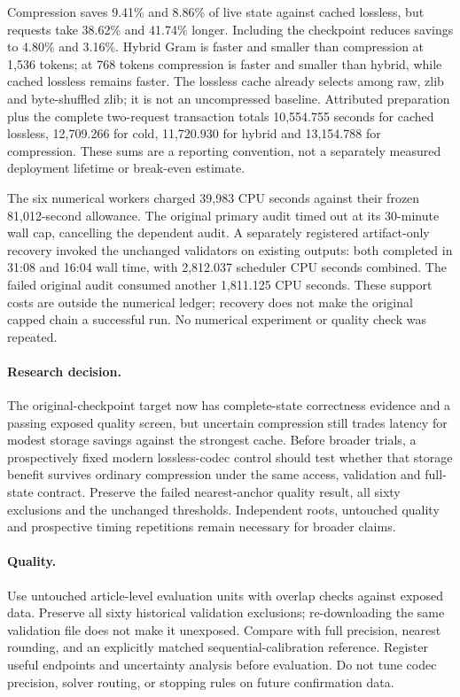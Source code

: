\documentclass[10pt,twocolumn,letterpaper]{article}
\begin{document}
Compression saves 9.41\% and 8.86\% of live state against cached lossless,
but requests take 38.62\% and 41.74\% longer. Including the checkpoint reduces
savings to 4.80\% and 3.16\%. Hybrid Gram is faster and smaller than compression
at 1,536 tokens; at 768 tokens compression is faster and smaller than hybrid,
while cached lossless remains faster. The lossless cache already selects among
raw, zlib and byte-shuffled zlib; it is not an uncompressed baseline.
Attributed preparation plus the complete two-request transaction totals
10,554.755 seconds for cached lossless, 12,709.266 for cold, 11,720.930 for hybrid
and 13,154.788 for compression. These sums are a reporting convention, not a
separately measured deployment lifetime or break-even estimate.

The six numerical workers charged 39,983 CPU seconds against their frozen
81,012-second allowance. The original primary audit timed out at its 30-minute
wall cap, cancelling the dependent audit. A separately registered artifact-only
recovery invoked the unchanged validators on existing outputs: both completed
in 31:08 and 16:04 wall time, with 2,812.037 scheduler CPU seconds combined.
The failed original audit consumed another 1,811.125 CPU seconds. These support
costs are outside the numerical ledger; recovery does not make the original
capped chain a successful run. No numerical experiment or quality check was repeated.

\paragraph{Research decision.}
The original-checkpoint target now has complete-state correctness evidence and a
passing exposed quality screen, but uncertain compression still trades latency
for modest storage savings against the strongest cache. Before broader trials,
a prospectively fixed modern lossless-codec control should test whether that
storage benefit survives ordinary compression under the same access, validation
and full-state contract. Preserve the failed nearest-anchor quality result,
all sixty exclusions and the unchanged thresholds. Independent roots, untouched
quality and prospective timing repetitions remain necessary for broader claims.

\paragraph{Quality.}
Use untouched article-level evaluation units with overlap checks against exposed
data. Preserve all sixty historical validation exclusions; re-downloading the
same validation file does not make it unexposed. Compare with full precision,
nearest rounding, and an explicitly matched sequential-calibration reference.
Register useful endpoints and uncertainty analysis before evaluation. Do not tune
codec precision, solver routing, or stopping rules on future confirmation data.
\end{document}
